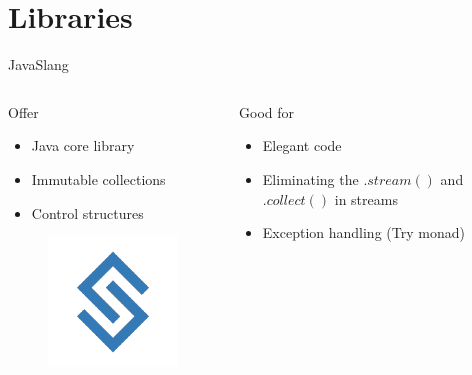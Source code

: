 \documentclass[14pt]{beamer}
\begin{document}
\section{Libraries}
\begin{frame}[fragile]{JavaSlang}
   \begin{columns}
       \begin{column}{0.5\textwidth}
           Offer
           	\begin{itemize}
               \item Java core library
               \item Immutable collections
               \item Control structures
           \end{itemize}
       \begin{figure}
           \centering
           \includegraphics[width=0.3\linewidth]{Images/slang}
       \end{figure}
       \end{column}
   
       \begin{column}{0.5\textwidth}  %
           Good for
           \begin{itemize}
               \item Elegant code
               \item Eliminating the $.stream()$ and $.collect()$ in streams
               \item Exception handling (Try monad)
           \end{itemize}
       \end{column}
   \end{columns}

\end{frame}
\end{document}
